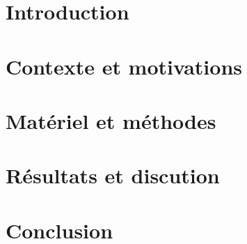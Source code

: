 

\newpage
\section{Introduction}
\label{sec:intro}



\newpage
\section{Contexte et motivations}
\label{sec:ctx}



\newpage
\section{Matériel et méthodes}\label{sec:mm}



\newpage
\section{Résultats et discution}
\label{sec:rd}



\newpage
\section{Conclusion}
\label{sec:conc}

